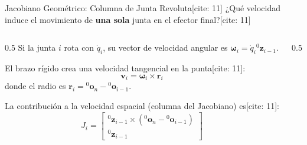 \documentclass[aspectratio=169, xcolor={table,xcdraw}]{beamer}
\begin{document}
\begin{frame}{Jacobiano Geométrico: Columna de Junta Revoluta[cite: 11]}
    ¿Qué velocidad induce el movimiento de \textbf{una sola} junta en el efector final?[cite: 11]
    
    \begin{columns}[T]
        \begin{column}{0.5\textwidth}
            Si la junta $i$ rota con $\dot{q}_i$, su vector de velocidad angular es $\boldsymbol{\omega}_i = \dot{q}_i {}^0\mathbf{z}_{i-1}$.
            
            \vspace{0.2cm}
            El brazo rígido crea una velocidad tangencial en la punta[cite: 11]:
            \begin{equation*}
                \mathbf{v}_i = \boldsymbol{\omega}_i \times \mathbf{r}_i
            \end{equation*}
            donde el radio es $\mathbf{r}_i = {}^0\mathbf{o}_n - {}^0\mathbf{o}_{i-1}$.
            
            \vspace{0.2cm}
            La contribución a la velocidad espacial (columna del Jacobiano) es[cite: 11]:
            \begin{equation*}
                \boxed{
                J_i = \begin{bmatrix}
                {}^0\mathbf{z}_{i-1} \times ({}^0\mathbf{o}_n - {}^0\mathbf{o}_{i-1}) \\
                {}^0\mathbf{z}_{i-1}
                \end{bmatrix}
                }
            \end{equation*}
        \end{column}
        \begin{column}{0.5\textwidth}
            \centering
\end{column}
\end{columns}
\end{frame}
\end{document}
